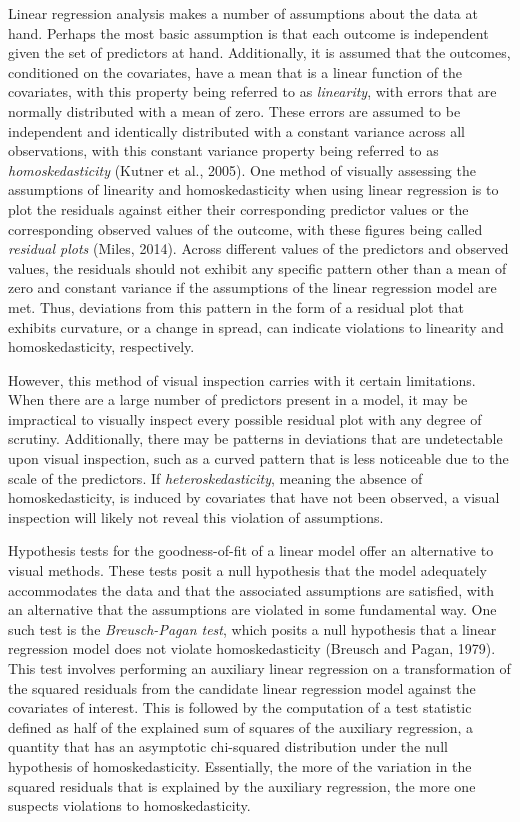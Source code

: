 		Linear regression analysis makes a number of assumptions about the data at hand. Perhaps the most basic assumption is that each outcome is independent given the set of predictors at hand.
		Additionally, it is assumed that the outcomes, conditioned on the covariates, have a mean that is a linear function of the covariates, with this property being referred to as \textit{linearity},
		with errors that are normally distributed with a mean of zero. These errors are assumed to be independent and identically distributed with a constant variance across all observations, with this
		constant variance property being referred to as \textit{homoskedasticity} (Kutner et al., 2005). One method of visually assessing the assumptions of linearity and homoskedasticity when using linear
		regression is to plot the residuals against either their corresponding predictor values or the corresponding observed values of the outcome, with these figures being called \textit{residual plots} (Miles, 2014). Across different values
		of the predictors and observed values, the residuals should not exhibit any specific pattern other than a mean of zero and constant variance if the assumptions of the linear regression model are met.
		Thus, deviations from this pattern in the form of a residual plot that exhibits curvature, or a change in spread, can indicate violations
		to linearity and homoskedasticity, respectively.

		However, this method of visual inspection carries with it certain limitations. When there are a large number of predictors present in a model, it may be impractical to visually inspect every
		possible residual plot with any degree of scrutiny. Additionally, there may be patterns in deviations that are undetectable upon visual inspection, such as a curved pattern that is less noticeable
		due to the scale of the predictors. If \textit{heteroskedasticity}, meaning the absence of homoskedasticity, is induced by covariates that have not been observed, a visual inspection will likely
		not reveal this violation of assumptions.

		Hypothesis tests for the goodness-of-fit of a linear model offer an alternative to visual methods. These tests posit a null hypothesis that the model adequately accommodates the data and that
		the associated assumptions are satisfied, with an alternative that the assumptions are violated in some fundamental way. One such test is the \textit{Breusch-Pagan test}, which posits a null hypothesis
		that a linear regression model does not violate homoskedasticity (Breusch and Pagan, 1979). This test involves performing an auxiliary linear regression on a transformation of the squared residuals from
		the candidate linear regression model against the covariates of interest. This is followed by the computation of a test statistic defined as half of the explained sum of squares of the auxiliary
		regression, a quantity that has an asymptotic chi-squared distribution under the null hypothesis of homoskedasticity. Essentially, the more of the variation in the squared residuals that is explained
		by the auxiliary regression, the more one suspects violations to homoskedasticity.

